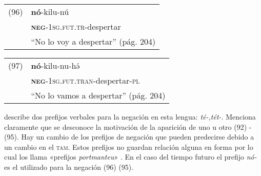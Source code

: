 {%
\begin{tabular}{ll}
(96) & \textbf{nó}-kilu-nú \\
& \textsc{\textbf{neg}-1sg.fut.tr}-despertar \\
& ``No lo voy a despertar'' (pág. 204)
\end{tabular} \vspace{0.5cm}

\begin{tabular}{ll}
(97) & \textbf{nó}-kilu-nu-hə́ \\
& \textsc{\textbf{neg}-1sg.fut.tran}-despertar-\textsc{pl} \\
& ``No lo vamos a despertar'' (pág. 204)
\end{tabular} \vspace{0.5cm}

}

\textcolor{MidnightBlue}{\citet{Tlahuica}} describe dos prefijos verbales para la negación en esta lengua: {\setmainfont{Charis SIL} \textit{té-,tét-}}. Menciona claramente que se desconoce la motivación de la aparición de uno u otro (92) - (95). Hay un cambio de los prefijos de negación que pueden predecirse debido a un cambio en el \textsc{tam}. Estos prefijos no guardan relación alguna en forma por lo cual los llama «prefijos \textit{portmanteu}» \textcolor{MidnightBlue}{\citep[pág. 200]{Tlahuica}}. En el caso del tiempo futuro el prefijo {\setmainfont{Charis SIL} \textit{nó-}} es el utilizado para la negación (96) (95).
